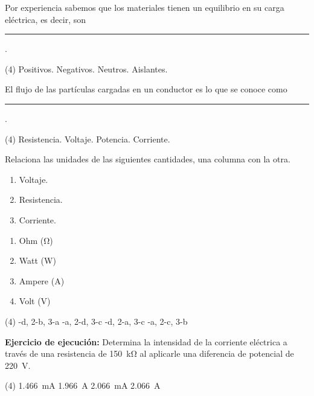 \documentclass[12pt, letter]{exam}
\begin{document}
\begin{questions}
    \question Por experiencia sabemos que los materiales tienen un equilibrio en su carga eléctrica, es decir, son \rule{2cm}{0.1mm}.
    \begin{tasks}(4)
        \task Positivos.
        \task Negativos.
        \task Neutros.
        \task Aislantes.
    \end{tasks}
    \question El flujo de las partículas cargadas en un conductor es lo que se conoce como \rule{2cm}{0.1mm}.
    \begin{tasks}(4)
        \task Resistencia.
        \task Voltaje.
        \task Potencia.
        \task Corriente.
    \end{tasks}
    \question Relaciona las unidades de las siguientes cantidades, una columna con la otra.
    \\
    \begin{minipage}[t]{0.4\linewidth}
        \begin{enumerate}[label=\arabic*)]
            \item Voltaje.
            \item Resistencia.
            \item Corriente.
        \end{enumerate}
    \end{minipage}
    \begin{minipage}[t]{0.4\linewidth}
        \begin{enumerate}[label=\alph*)]
            \item Ohm (\si{\ohm})
            \item Watt (\si{\watt})
            \item Ampere (\si{\ampere})
            \item Volt (\si{\volt})
        \end{enumerate}
    \end{minipage}
    \begin{tasks}(4)
        -d, 2-b, 3-a
        -a, 2-d, 3-c
        -d, 2-a, 3-c
        -a, 2-c, 3-b
    \end{tasks}
    \question \textbf{Ejercicio de ejecución: } Determina la intensidad de la corriente eléctrica a través de una resistencia de \SI{150}{\kilo\ohm} al aplicarle una diferencia de potencial de \SI{220}{\volt}.
    \begin{tasks}(4)
        \task \SI{1.466}{\milli\ampere}
        \task \SI{1.966}{\ampere}
        \task \SI{2.066}{\milli\ampere}
        \task \SI{2.066}{\ampere}
    \end{tasks}


\end{questions}
\end{document}
